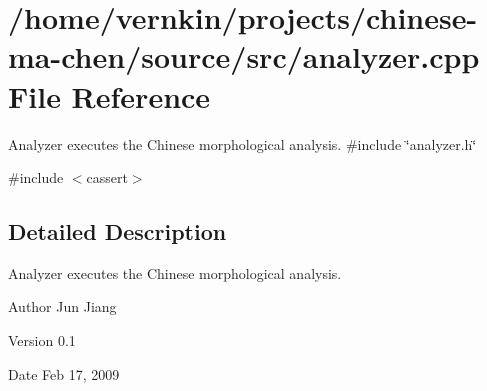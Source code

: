 \section{/home/vernkin/projects/chinese-\/ma-\/chen/source/src/analyzer.cpp File Reference}
\label{analyzer_8cpp}


Analyzer executes the Chinese morphological analysis.  
{\ttfamily \#include \char`\"{}analyzer.h\char`\"{}}\par
{\ttfamily \#include $<$cassert$>$}\par


\subsection{Detailed Description}
Analyzer executes the Chinese morphological analysis. \begin{DoxyAuthor}{Author}
Jun Jiang 
\end{DoxyAuthor}
\begin{DoxyVersion}{Version}
0.1 
\end{DoxyVersion}
\begin{DoxyDate}{Date}
Feb 17, 2009 
\end{DoxyDate}
